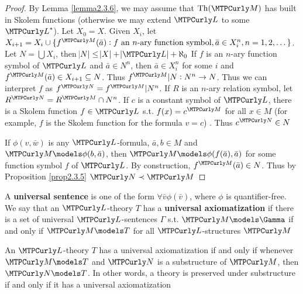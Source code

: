 \documentclass[11pt]{article}
\begin{document}
\begin{proof}
By Lemma \ref{lemma2.3.6}, we may assume that \(\Th(\calm)\) has built in
Skolem functions (otherwise we may extend \(\call\) to some \(\call^*\)). Let
\(X_0=X\). Given \(X_i\), let \(X_{i+1}=X_i\cup\{f^\calm(\bar{a}):f\text{ an
   }n\text{-ary function symbol},\bar{a}\in X^n_i,n=1,2,\dots\}\). Let
\(N=\bigcup X_i\), then \(\abs{N}\le\abs{X}+\abs{\call}+\aleph_0\)
If \(f\) is an \(n\)-ary function symbol of \(\call\) and \(\bar{a}\in N^n\),
then \(\bar{a}\in X^n_i\) for some \(i\) and 
\(f^\calm(\bar{a})\in X_{i+1}\subseteq N\). Thus \(f^\calm|N:N^n\to N\). Thus
we can interpret \(f\) as \(f^\caln=f^\calm|N^n\). If \(R\) is an \(n\)-ary
relation symbol, let \(R^\caln=R^\calm\cap N^n\). If \(c\) is a constant
symbol of \(\call\), there is a Skolem function \(f\in\call\) s.t. 
\(f(x)=c^\calm\) for all \(x\in M\) (for example, \(f\) is the Skolem
function for the formula \(v=c\)) . Thus \(c^\caln\in N\)

If \(\phi(v,\bar{w})\) is any \(\call\)-formula, \(\bar{a},b\in M\) and
\(\calm\models\phi(b,\bar{a})\), then
\(\calm\models\phi(f(\bar{a}),\bar{a})\) for some function symbol \(f\) of
\(\call\). By construction, \(f^\calm(\bar{a})\in N\). Thus by Proposition
\ref{prop2.3.5} \(\caln\prec\calm\)
\end{proof}

\begin{definition}[]
A \textbf{universal sentence} is one of the form \(\forall\bar{v}\phi(\bar{v})\), where
\(\phi\) is quantifier-free. We say that an \(\call\)-theory \(T\) has a \textbf{universal
axiomatization} if there is a set of universal \(\call\)-sentences \(\Gamma\) s.t. 
\(\calm\models\Gamma\) if and only if \(\calm\models T\) for all
\(\call\)-structures \(\calm\)
\end{definition}

\begin{theorem}[]
An \(\call\)-theory \(T\) has a universal axiomatization if and only if
whenever \(\calm\models T\) and \(\caln\) is a substructure of \(\calm\),
then \(\caln\models T\). In other words, a theory is preserved under
substructure if and only if it has a universal axiomatization
\end{theorem}
\end{document}
